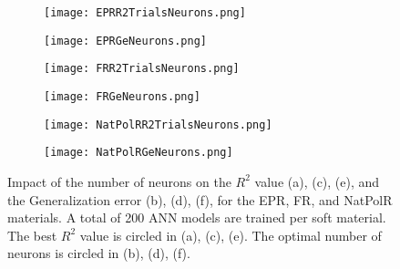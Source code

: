 \begin{figure}[htbp!]
	\centering
    
    \begin{subfigure}[b]{0.49\textwidth}
        \centering
        \texttt{[image: EPRR2TrialsNeurons.png]}
        \caption{}
        \label{fig:TrialsNeuronsEPR}
    \end{subfigure}
\begin{subfigure}[b]{0.49\textwidth}
	\centering
	\texttt{[image: EPRGeNeurons.png]}
	\caption{}
	\label{fig:GenNeuronsEPR}
\end{subfigure}
    
    \begin{subfigure}[b]{0.49\textwidth}
        \centering
        \texttt{[image: FRR2TrialsNeurons.png]}
        \caption{}
        \label{fig:TrialsNeuronsFR}
    \end{subfigure}
\begin{subfigure}[b]{0.49\textwidth}
	\centering
	\texttt{[image: FRGeNeurons.png]}
	\caption{}
	\label{fig:GenNeuronsFR}
\end{subfigure}
    
    \begin{subfigure}[b]{0.49\textwidth}
        \centering
        \texttt{[image: NatPolRR2TrialsNeurons.png]}
        \caption{}
        \label{fig:TrialsNeuronsNatPolR}
    \end{subfigure}
\begin{subfigure}[b]{0.49\textwidth}
	\centering
	\texttt{[image: NatPolRGeNeurons.png]}
	\caption{}
	\label{fig:GenNeuronsNatPolR}
\end{subfigure}
    \caption{Impact of the number of neurons on the $R^2$ value (a), (c), (e), and the Generalization error (b), (d), (f), for the EPR, FR, and NatPolR materials. A total of 200 ANN models are trained per soft material. The best $R^2$ value is circled in (a), (c), (e). The optimal number of neurons is circled in (b), (d), (f).}
    \label{fig:TrialsNeurons1}
\end{figure}

